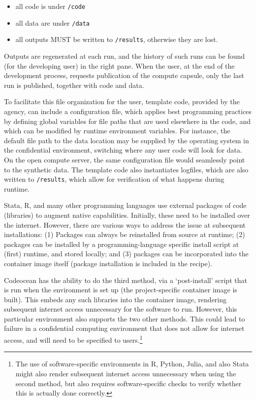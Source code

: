 \documentclass[inline]{hdsr}
\begin{document}
\begin{itemize}
    \item all code is under \texttt{/code}
    \item all data are under \texttt{/data}
    \item all outputs MUST be written to \texttt{/results}, otherwise they are lost.
\end{itemize}

Outputs are regenerated at each run, and the history of such runs can be found (for the developing user) in the right pane. When the user, at the end of the development process, requests publication of the compute capsule, only the last run is published, together with code and data.

To facilitate this file organization for the user, template code, provided by the agency, can include a configuration file, which applies best programming practices by defining global variables for file paths that are used elsewhere in the code, and which can be modified by runtime environment variables. For instance, the default file path to the data location may be supplied by the operating system in the confidential environment, switching where any user code will look for data. On the open compute server, the same configuration file would seamlessly point to the synthetic data. The template code also instantiates logfiles, which are also written to \texttt{/results}, which allow for verification of what happens during runtime.



Stata, R, and many other programming languages use external packages of code (libraries) to augment native capabilities. Initially, these need to be installed over the internet. However, there are various ways to address the issue at subsequent installations: (1) Packages can always be reinstalled from source at runtime; (2) packages can be installed by a programming-language specific install script at (first) runtime, and stored locally; and (3) packages can be incorporated into the container image itself (package installation is included in the recipe).

Codeocean has the ability to do the third method, via a `post-install' script that is run when the environment is set up (the project-specific container image is built). This embeds any such libraries into the container image, rendering subsequent internet access unnecessary for the software to run. However, this particular environment also supports the two other methods. This could lead to failure in a confidential computing environment that does not allow for internet access, and will need to be specified to users.\footnote{The use of software-specific environments in R, Python, Julia, and also Stata might also render subsequent internet access unnecessary when using the second method, but also requires software-specific checks to verify whether this is actually done correctly.}
\end{document}
